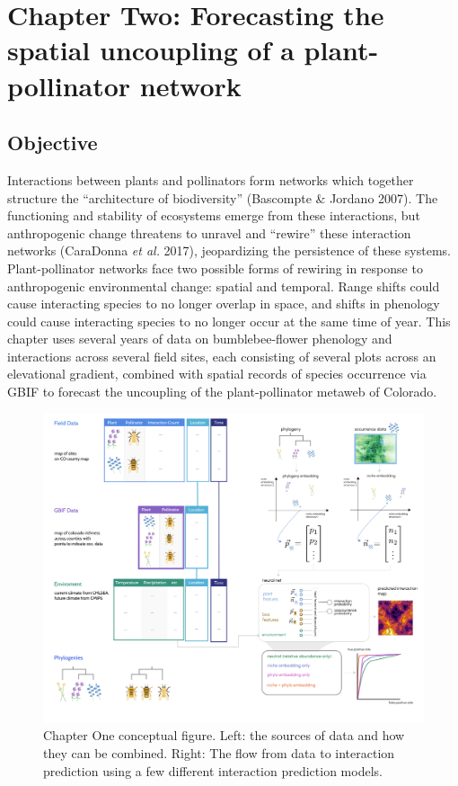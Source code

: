 \documentclass[10pt,oneside]{article}
\makeatletter
\def\maxwidth{\ifdim\Gin@nat@width>\linewidth\linewidth
\else\Gin@nat@width\fi}
\let\Oldincludegraphics\includegraphics
\renewcommand{\includegraphics}[1]{\Oldincludegraphics[width=\maxwidth]{#1}}
\makeatother
\begin{document}
\hypertarget{chapter-two-forecasting-the-spatial-uncoupling-of-a-plant-pollinator-network}{%
\section{Chapter Two: Forecasting the spatial uncoupling of a
plant-pollinator
network}\label{chapter-two-forecasting-the-spatial-uncoupling-of-a-plant-pollinator-network}}

\hypertarget{objective-1}{%
\subsection{Objective}\label{objective-1}}

Interactions between plants and pollinators form networks which together
structure the ``architecture of biodiversity'' (Bascompte \& Jordano
2007). The functioning and stability of ecosystems emerge from these
interactions, but anthropogenic change threatens to unravel and
``rewire'' these interaction networks (CaraDonna \emph{et al.} 2017),
jeopardizing the persistence of these systems. Plant-pollinator networks
face two possible forms of rewiring in response to anthropogenic
environmental change: spatial and temporal. Range shifts could cause
interacting species to no longer overlap in space, and shifts in
phenology could cause interacting species to no longer occur at the same
time of year. This chapter uses several years of data on
bumblebee-flower phenology and interactions across several field sites,
each consisting of several plots across an elevational gradient,
combined with spatial records of species occurrence via GBIF to forecast
the uncoupling of the plant-pollinator metaweb of Colorado.

\begin{figure}
\centering
\includegraphics{./figures/ch1.png}
\caption{Chapter One conceptual figure. Left: the sources of data and
how they can be combined. Right: The flow from data to interaction
prediction using a few different interaction prediction models.}
\end{figure}
\end{document}
